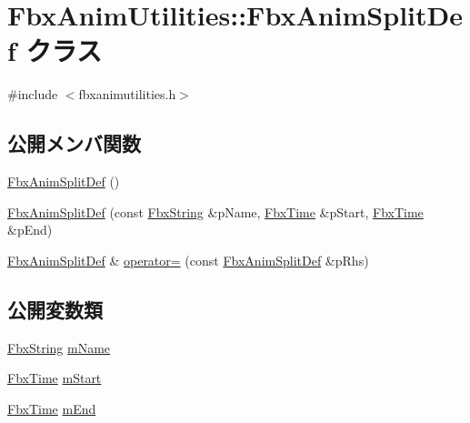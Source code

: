 \hypertarget{class_fbx_anim_utilities_1_1_fbx_anim_split_def}{}\section{Fbx\+Anim\+Utilities\+:\+:Fbx\+Anim\+Split\+Def クラス}
\label{class_fbx_anim_utilities_1_1_fbx_anim_split_def}


{\ttfamily \#include $<$fbxanimutilities.\+h$>$}

\subsection*{公開メンバ関数}
\begin{DoxyCompactItemize}
\item 
\hyperlink{class_fbx_anim_utilities_1_1_fbx_anim_split_def_ad921439ab544295b62f250b3b1a8e3da}{Fbx\+Anim\+Split\+Def} ()
\item 
\hyperlink{class_fbx_anim_utilities_1_1_fbx_anim_split_def_a90737793295d433c713584ffd27fa5c1}{Fbx\+Anim\+Split\+Def} (const \hyperlink{class_fbx_string}{Fbx\+String} \&p\+Name, \hyperlink{class_fbx_time}{Fbx\+Time} \&p\+Start, \hyperlink{class_fbx_time}{Fbx\+Time} \&p\+End)
\item 
\hyperlink{class_fbx_anim_utilities_1_1_fbx_anim_split_def}{Fbx\+Anim\+Split\+Def} \& \hyperlink{class_fbx_anim_utilities_1_1_fbx_anim_split_def_a94315e091906bc664030ee1000785e90}{operator=} (const \hyperlink{class_fbx_anim_utilities_1_1_fbx_anim_split_def}{Fbx\+Anim\+Split\+Def} \&p\+Rhs)
\end{DoxyCompactItemize}
\subsection*{公開変数類}
\begin{DoxyCompactItemize}
\item 
\hyperlink{class_fbx_string}{Fbx\+String} \hyperlink{class_fbx_anim_utilities_1_1_fbx_anim_split_def_ae78929097a3526acf01e3d0f7f89796f}{m\+Name}
\item 
\hyperlink{class_fbx_time}{Fbx\+Time} \hyperlink{class_fbx_anim_utilities_1_1_fbx_anim_split_def_af8aad5671b9f1bef7a5af4a226a0f646}{m\+Start}
\item 
\hyperlink{class_fbx_time}{Fbx\+Time} \hyperlink{class_fbx_anim_utilities_1_1_fbx_anim_split_def_a16aca4564d9609c2409c3be7fb0a5bd3}{m\+End}
\end{DoxyCompactItemize}


